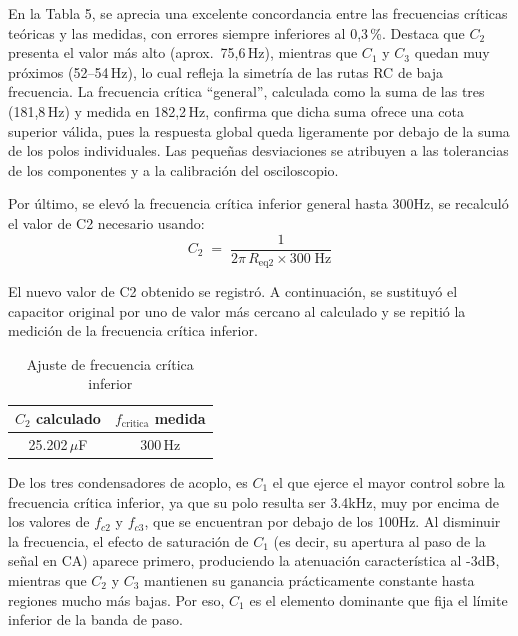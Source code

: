 \documentclass[journal]{IEEEtran}
\begin{document}
\par En la Tabla 5, se aprecia una excelente concordancia entre las frecuencias críticas teóricas y las medidas, con errores siempre inferiores al 0,3\,\%. Destaca que $C_2$ presenta el valor más alto (aprox.\ 75,6\,Hz), mientras que $C_1$ y $C_3$ quedan muy próximos (52–54\,Hz), lo cual refleja la simetría de las rutas RC de baja frecuencia. La frecuencia crítica “general”, calculada como la suma de las tres (181,8\,Hz) y medida en 182,2\,Hz, confirma que dicha suma ofrece una cota superior válida, pues la respuesta global queda ligeramente por debajo de la suma de los polos individuales. Las pequeñas desviaciones se atribuyen a las tolerancias de los componentes y a la calibración del osciloscopio.
\par Por último, se elevó la frecuencia crítica inferior general hasta 300Hz, se recalculó el valor de C2 necesario usando:
\begin{equation}
C_2 \;=\;\frac{1}{2\pi\,R_{\mathrm{eq2}}\times300\;\mathrm{Hz}}
\end{equation}
\par El nuevo valor de C2 obtenido se registró. A continuación, se sustituyó el capacitor original por uno de valor más cercano al calculado y se repitió la medición de la frecuencia crítica inferior. 
\begin{table}[h]
    \centering
    \caption{Ajuste de frecuencia crítica inferior}
    \renewcommand{\arraystretch}{1.2}
    \begin{tabular}{|c|c|}
        \hline
        \textbf{$C_2$ calculado} & \textbf{$f_{\mathrm{critica}}$ medida} \\ \hline
        25.202\,$\mu$F           & 300\,Hz                                \\ \hline
    \end{tabular}
    \label{tab:ajuste_frecuencia_inferior}
\end{table}
\par De los tres condensadores de acoplo, es \(C_1\) el que ejerce el mayor control sobre la frecuencia crítica inferior, ya que su polo resulta ser 3.4kHz, muy por encima de los valores de \(f_{c2}\) y \(f_{c3}\), que se encuentran por debajo de los 100Hz. Al disminuir la frecuencia, el efecto de saturación de \(C_1\) (es decir, su apertura al paso de la señal en CA) aparece primero, produciendo la atenuación característica al -3dB, mientras que \(C_2\) y \(C_3\) mantienen su ganancia prácticamente constante hasta regiones mucho más bajas. Por eso, \(C_1\) es el elemento dominante que fija el límite inferior de la banda de paso.
\end{document}
